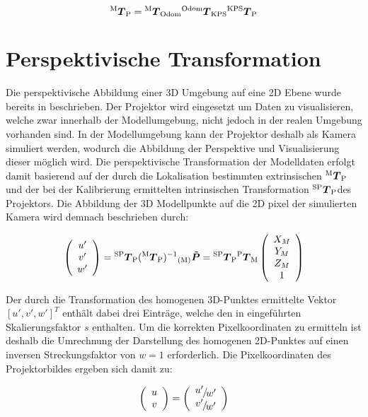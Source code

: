 \begin{equation}
{^{\mathrm{M}}\mbox{\boldmath{$T$}}_{\mathrm{P}}} = {^{\mathrm{M}}\mbox{\boldmath{$T$}}_{\mathrm{Odom}}}{^{\mathrm{Odom}}\mbox{\boldmath{$T$}}_{\mathrm{KPS}}}{^{\mathrm{KPS}}\mbox{\boldmath{$T$}}_{\mathrm{P}}}
\end{equation}

\section{Perspektivische Transformation}
Die perspektivische Abbildung einer 3D Umgebung auf eine 2D Ebene wurde bereits in  beschrieben. Der Projektor wird eingesetzt um Daten zu visualisieren, welche zwar innerhalb der Modellumgebung, nicht jedoch in der realen Umgebung vorhanden sind. In der Modellumgebung kann der Projektor deshalb als Kamera simuliert werden, wodurch die Abbildung der Perspektive und Visualisierung dieser möglich wird. Die perspektivische Transformation der Modelldaten erfolgt damit basierend auf der durch die Lokalisation bestimmten extrinsischen ${^{\mathrm{M}}\mbox{\boldmath{$T$}}_{\mathrm{P}}}$ und der bei der Kalibrierung ermittelten intrinsischen Transformation ${^{\mathrm{SP}}\mbox{\boldmath{$T$}}_{\mathrm{P}}}$ des Projektors. Die Abbildung der 3D Modellpunkte auf die 2D pixel der simulierten Kamera wird demnach beschrieben durch:

\begin{equation}
\left(\begin{array}{c}
u'\\
v'\\
w'
\end{array}\right)
= {^{\mathrm{SP}}\mbox{\boldmath{$T$}}_{\mathrm{P}}}({^{\mathrm{M}}\mbox{\boldmath{$T$}}_{\mathrm{P}}})^{-1}{_{{\mathrm{(M)}}}}\mbox{\boldmath{$\tilde{P}$}} = {^{\mathrm{SP}}\mbox{\boldmath{$T$}}_{\mathrm{P}}}{^{\mathrm{P}}\mbox{\boldmath{$T$}}_{\mathrm{M}}} \left(\begin{array}{c}
X_M\\
Y_M\\
Z_M\\
1
\end{array} \right)
\label{eq.proj_trans}
\end{equation}

Der durch die Transformation des homogenen 3D-Punktes ermittelte Vektor $[u',v',w']^T$ enthält dabei drei Einträge, welche den in  eingeführten Skalierungsfaktor $s$ enthalten. Um die korrekten Pixelkoordinaten zu ermitteln ist deshalb die Umrechnung der Darstellung des homogenen 2D-Punktes auf einen inversen Streckungsfaktor von $w=1$ erforderlich. Die Pixelkoordinaten des Projektorbildes ergeben sich damit zu:

\begin{equation}
\left(\begin{array}{c}
u\\
v
\end{array}\right)
=
\left(\begin{array}{c}
\nicefrac{u'}{w'}\\
\nicefrac{v'}{w'}
\end{array}\right)
\end{equation}

